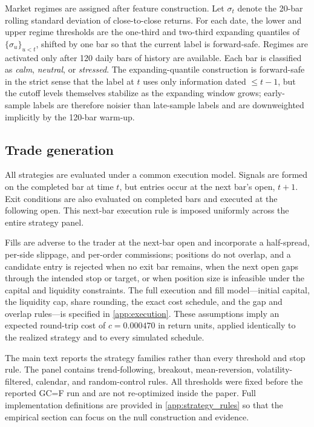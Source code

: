 \documentclass[preprint,12pt]{elsarticle}
\theoremstyle{definition}
\begin{document}
Market regimes are assigned after feature construction. Let \(\sigma_t\) denote the 20-bar rolling standard deviation of close-to-close returns. For each date, the lower and upper regime thresholds are the one-third and two-third expanding quantiles of \(\{\sigma_u\}_{u<t}\), shifted by one bar so that the current label is forward-safe. Regimes are activated only after 120 daily bars of history are available. Each bar is classified as \emph{calm}, \emph{neutral}, or \emph{stressed}. The expanding-quantile construction is forward-safe in the strict sense that the label at $t$ uses only information dated $\le t-1$, but the cutoff levels themselves stabilize as the expanding window grows; early-sample labels are therefore noisier than late-sample labels and are downweighted implicitly by the 120-bar warm-up.

\subsection{Trade generation}

All strategies are evaluated under a common execution model. Signals are formed on the completed bar at time \(t\), but entries occur at the next bar's open, \(t+1\). Exit conditions are also evaluated on completed bars and executed at the following open. This next-bar execution rule is imposed uniformly across the entire strategy panel.

Fills are adverse to the trader at the next-bar open and incorporate a half-spread, per-side slippage, and per-order commissions; positions do not overlap, and a candidate entry is rejected when no exit bar remains, when the next open gaps through the intended stop or target, or when position size is infeasible under the capital and liquidity constraints. The full execution and fill model---initial capital, the liquidity cap, share rounding, the exact cost schedule, and the gap and overlap rules---is specified in \ref{app:execution}. These assumptions imply an expected round-trip cost of $c=0.000470$ in return units, applied identically to the realized strategy and to every simulated schedule.

The main text reports the strategy families rather than every threshold and stop rule. The panel contains trend-following, breakout, mean-reversion, volatility-filtered, calendar, and random-control rules. All thresholds were fixed before the reported GC=F run and are not re-optimized inside the paper. Full implementation definitions are provided in \ref{app:strategy_rules} so that the empirical section can focus on the null construction and evidence.
\end{document}

